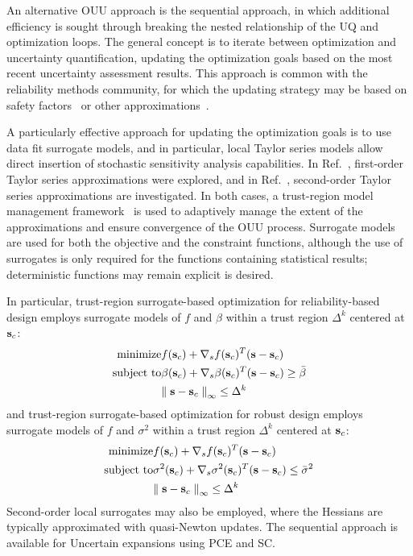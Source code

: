 An alternative OUU approach is the sequential approach, in which
additional efficiency is sought through breaking the nested
relationship of the UQ and optimization loops.  The general concept is
to iterate between optimization and uncertainty quantification,
updating the optimization goals based on the most recent uncertainty
assessment results.  This approach is common with the reliability
methods community, for which the updating strategy may be based on
safety factors~\cite{Wu01} or other approximations~\cite{Du04}.

A particularly effective approach for updating the optimization goals
is to use data fit surrogate models, and in particular, local Taylor
series models allow direct insertion of stochastic sensitivity
analysis capabilities.  In Ref.~\cite{Eld05}, first-order Taylor
series approximations were explored, and in Ref.~\cite{Eld06a},
second-order Taylor series approximations are investigated.  In both
cases, a trust-region model management framework~\cite{Eld06b} is
used to adaptively manage the extent of the approximations and ensure
convergence of the OUU process.  Surrogate models are used for both
the objective and the constraint functions, although the use of
surrogates is only required for the functions containing statistical
results; deterministic functions may remain explicit is desired.

In particular, trust-region surrogate-based optimization for
reliability-based design employs surrogate models of $f$ and $\beta$
within a trust region $\Delta^k$ centered at ${\bf s}_c$:
\begin{eqnarray}
  {\rm minimize }     & f({\bf s}_c) + \nabla_s f({\bf s}_c)^T
({\bf s} - {\bf s}_c) \nonumber \\
  {\rm subject \ to } & \beta({\bf s}_c) + \nabla_s \beta({\bf s}_c)^T
({\bf s} - {\bf s}_c) \ge \bar{\beta} \\
& {\parallel {\bf s} - {\bf s}_c \parallel}_\infty \le \Delta^k \nonumber
\label{eq:rbdo_surr}
\end{eqnarray}
and trust-region surrogate-based optimization for robust design
employs surrogate models of $f$ and $\sigma^2$ within a trust region
$\Delta^k$ centered at ${\bf s}_c$:
\begin{eqnarray}
  {\rm minimize }     & f({\bf s}_c) + \nabla_s f({\bf s}_c)^T
({\bf s} - {\bf s}_c) \nonumber \\
  {\rm subject \ to } & \sigma^2({\bf s}_c) + \nabla_s \sigma^2({\bf s}_c)^T 
({\bf s} - {\bf s}_c) \le \bar{\sigma}^2 \\
& {\parallel {\bf s} - {\bf s}_c \parallel}_\infty \le \Delta^k \nonumber
\label{eq:rdo_surr}
\end{eqnarray}
Second-order local surrogates may also be employed, where the Hessians
are typically approximated with quasi-Newton updates.  The sequential
approach is available for Uncertain expansions using PCE and SC.


